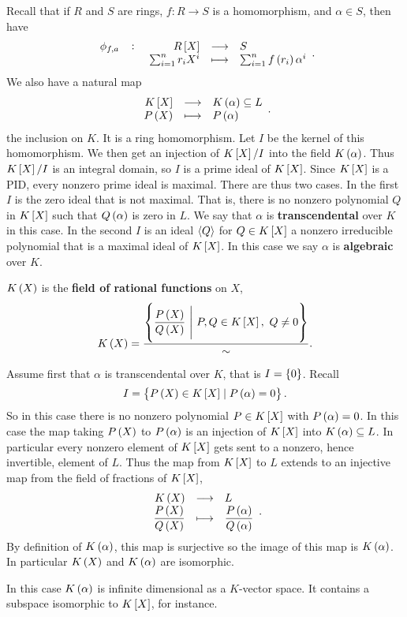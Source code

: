 Recall that if $ R $ and $ S $ are rings, $ f : R \to S $ is a homomorphism, and $ \alpha \in S $, then have
$$ \function[\phi_{f, a}]{R\sbr{X}}{S}{\sum_{i = 1}^n r_iX^i}{\sum_{i = 1}^n f\br{r_i}\alpha^i}. $$
We also have a natural map
$$ \function{K\sbr{X}}{K\br{\alpha} \subseteq L}{P\br{X}}{P\br{\alpha}}. $$
the inclusion on $ K $. It is a ring homomorphism. Let $ I $ be the kernel of this homomorphism. We then get an injection of $ K\sbr{X} / I $ into the field $ K\br{\alpha} $. Thus $ K\sbr{X} / I $ is an integral domain, so $ I $ is a prime ideal of $ K\sbr{X} $. Since $ K\sbr{X} $ is a PID, every nonzero prime ideal is maximal. There are thus two cases. In the first $ I $ is the zero ideal that is not maximal. That is, there is no nonzero polynomial $ Q $ in $ K\sbr{X} $ such that $ Q\br{\alpha} $ is zero in $ L $. We say that $ \alpha $ is \textbf{transcendental} over $ K $ in this case. In the second $ I $ is an ideal $ \left\langle Q \right\rangle $ for $ Q \in K\sbr{X} $ a nonzero irreducible polynomial that is a maximal ideal of $ K\sbr{X} $. In this case we say $ \alpha $ is \textbf{algebraic} over $ K $.

\begin{definition}
$ K\br{X} $ is the \textbf{field of rational functions} on $ X $,
$$ K\br{X} = \dfrac{\cbr{\dfrac{P\br{X}}{Q\br{X}} \ \Bigg| \ P, Q \in K\sbr{X}, \ Q \ne 0}}{\sim}. $$
\end{definition}

\pagebreak

Assume first that $ \alpha $ is transcendental over $ K $, that is $ I = \cbr{0} $. Recall
$$ I = \cbr{P\br{X} \in K\sbr{X} \mid P\br{\alpha} = 0}. $$
So in this case there is no nonzero polynomial $ P \in K\sbr{X} $ with $ P\br{\alpha} = 0 $. In this case the map taking $ P\br{X} $ to $ P\br{\alpha} $ is an injection of $ K\sbr{X} $ into $ K\br{\alpha} \subseteq L $. In particular every nonzero element of $ K\sbr{X} $ gets sent to a nonzero, hence invertible, element of $ L $. Thus the map from $ K\sbr{X} $ to $ L $ extends to an injective map from the field of fractions of $ K\sbr{X} $,
$$ \function{K\br{X}}{L}{\dfrac{P\br{X}}{Q\br{X}}}{\dfrac{P\br{\alpha}}{Q\br{\alpha}}}. $$
By definition of $ K\br{\alpha} $, this map is surjective so the image of this map is $ K\br{\alpha} $. In particular $ K\br{X} $ and $ K\br{\alpha} $ are isomorphic.

\begin{note*}
In this case $ K\br{\alpha} $ is infinite dimensional as a $ K $-vector space. It contains a subspace isomorphic to $ K\sbr{X} $, for instance.
\end{note*}

